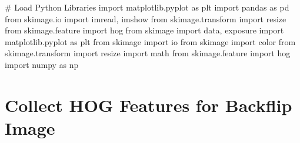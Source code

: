 \documentclass[
  letterpaper,
  DIV=11,
  numbers=noendperiod]{scrreprt}
\newenvironment{Shaded}{\begin{snugshade}}{\end{snugshade}}
\newcommand{\CommentTok}[1]{\textcolor[rgb]{0.37,0.37,0.37}{#1}}
\newcommand{\ImportTok}[1]{\textcolor[rgb]{0.00,0.46,0.62}{#1}}
\newcommand{\NormalTok}[1]{\textcolor[rgb]{0.00,0.23,0.31}{#1}}
\begin{document}
\begin{Shaded}
\begin{Highlighting}[]
\CommentTok{\# Load Python Libraries}
\ImportTok{import}\NormalTok{ matplotlib.pyplot }\ImportTok{as}\NormalTok{ plt}
\ImportTok{import}\NormalTok{ pandas }\ImportTok{as}\NormalTok{ pd}
\ImportTok{from}\NormalTok{ skimage.io }\ImportTok{import}\NormalTok{ imread, imshow}
\ImportTok{from}\NormalTok{ skimage.transform }\ImportTok{import}\NormalTok{ resize}
\ImportTok{from}\NormalTok{ skimage.feature }\ImportTok{import}\NormalTok{ hog}
\ImportTok{from}\NormalTok{ skimage }\ImportTok{import}\NormalTok{ data, exposure}
\ImportTok{import}\NormalTok{ matplotlib.pyplot }\ImportTok{as}\NormalTok{ plt}
\ImportTok{from}\NormalTok{ skimage }\ImportTok{import}\NormalTok{ io}
\ImportTok{from}\NormalTok{ skimage }\ImportTok{import}\NormalTok{ color}
\ImportTok{from}\NormalTok{ skimage.transform }\ImportTok{import}\NormalTok{ resize}
\ImportTok{import}\NormalTok{ math}
\ImportTok{from}\NormalTok{ skimage.feature }\ImportTok{import}\NormalTok{ hog}
\ImportTok{import}\NormalTok{ numpy }\ImportTok{as}\NormalTok{ np}
\end{Highlighting}
\end{Shaded}

\section{Collect HOG Features for Backflip
Image}\label{collect-hog-features-for-backflip-image}
\end{document}
